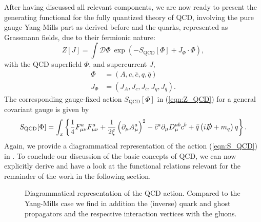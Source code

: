 After having discussed all relevant components, we are now ready to present the generating functional for the fully quantized theory of QCD, involving the pure gauge Yang-Mills part as derived before and the quarks, represented as Grassmann fields, due to their fermionic nature:
\begin{equation}
Z\left[J\right]=\int \mathcal{D}\Phi\ \exp\left(-S_{\mathrm{QCD}}[\Phi]+J_{\Phi}\cdot \Phi\right),
\label{eqn:Z_QCD}
\end{equation}
with the QCD superfield $\Phi$, and supercurrent $J$, 
\begin{equation}
\begin{aligned}
\Phi &= (A, c, \bar{c}, q, \bar{q})\\
J_{\Phi} &= (J_A, J_c, J_{\bar{c}}, J_{q}, J_{\bar{q}}).
\end{aligned}
\end{equation}
The corresponding gauge-fixed action $S_{\mathrm{QCD}}[\Phi]$ in (\ref{eqn:Z_QCD}) for a general covariant  gauge is given by
\begin{equation}
S_{\mathrm{QCD}}[\Phi]= \int_{x}\left\{\frac{1}{4}F_{\mu \nu}^{a} F_{\mu \nu}^{a}+\frac{1}{2 \xi}\left(\partial_{\mu} A_{\mu}^{a}\right)^{2}-\bar{c}^{a} \partial_{\mu} D_{\mu}^{a b} c^{b}+\bar{q}\left(i\slashed{D}+m_{q}\right) q\right\}.
\label{eqn:S_QCD}
\end{equation}
Again, we provide a diagrammatical representation of the action (\ref{eqn:S_QCD}) in . To conclude our discussion of the basic concepts of QCD, we can now explicitly derive and have a look at the functional relations relevant for the remainder of the work in the following section.
\begin{figure}[t]
\centering

\caption{Diagrammatical representation of the QCD action. Compared to the Yang-Mills case we find in addition the (inverse) quark and ghost propagators and the respective interaction vertices with the gluons.}
\label{fig:S_QCD}
\end{figure}


